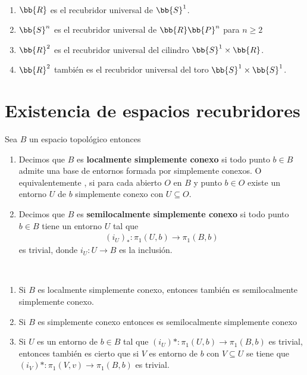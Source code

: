 \begin{ejemplo}\
    \begin{enumerate}
        \item $\bb{R}$ es el recubridor universal de $\bb{S}^1$.
        \item $\bb{S}^n$ es el recubridor universal de $\bb{R}\bb{P}^n$ para $n\geq 2$
        \item $\bb{R}^2$ es el recubridor universal del cilindro $\bb{S}^1 \times \bb{R}$.
        \item $\bb{R}^2$ también es el recubridor universal del toro $\bb{S}^1\times \bb{S}^1$.
    \end{enumerate}
\end{ejemplo}

\section{Existencia de espacios recubridores}

\begin{definicion}
    Sea $B$ un espacio topológico entonces 
    \begin{enumerate}
        \item Decimos que $B$ es \textbf{localmente simplemente conexo} si todo punto $b\in B$ admite una base de entornos formada por simplemente conexos. O equivalentemente , si para cada abierto $O$ en $B$ y punto $b\in O$ existe un entorno $U$ de $b$ simplemente conexo con $U\subseteq O$.

        \item Decimos que $B$ es \textbf{semilocalmente simplemente conexo} si todo punto $b\in B$ tiene un entorno $U$ tal que 
        \begin{gather*}
            (i_U)_* : \pi_1(U,b) \to \pi_1(B,b)
        \end{gather*}
        es trivial, donde $i_U:U\to B$ es la inclusión.
    \end{enumerate}
\end{definicion}

\begin{observacion}\
    \begin{enumerate}
        \item Si $B$ es localmente simplemente conexo, entonces también es semilocalmente simplemente conexo.
        \item Si $B$ es simplemente conexo entonces es semilocalmente simplemente conexo
        \item Si $U$ es un entorno de $b\in B$ tal que $(i_U)*: \pi_1(U,b) \to \pi_1(B,b)$ es trivial, entonces también es cierto que si $V$ es entorno de $b$ con $V\subseteq U$ se tiene que $(i_V)* : \pi_1(V,v)\to \pi_1(B,b)$ es trivial.
    \end{enumerate}
\end{observacion}

